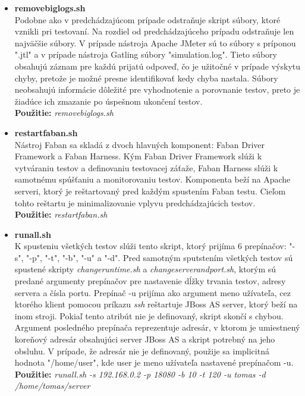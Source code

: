 \documentclass[12pt,oneside,final]{fithesis-utf8}
\newcommand\underscore[1]{\underline{\hspace{8pt}}}
\begin{document}
\begin{itemize}
\item \textbf{remove\underscore{}big\underscore{}logs.sh}\\
Podobne ako v predchádzajúcom prípade odstraňuje skript súbory, ktoré vznikli pri testovaní. Na rozdiel od predchádzajúceho prípadu odstraňuje len najväčšie súbory. V prípade nástroja Apache JMeter sú to súbory s príponou "{}.jtl"{} a v prípade nástroja Gatling súbory "{}simulation.log"{}. Tieto súbory obsahujú záznam pre každú prijatú odpoveď, čo je užitočné v prípade výskytu chyby, pretože je možné presne identifikovať kedy chyba nastala. Súbory neobsahujú informácie dôležité pre vyhodnotenie a porovnanie testov, preto je žiadúce ich zmazanie po úspešnom ukončení testov.\\
\textbf{Použitie:} \textit{remove\underscore{}big\underscore{}logs.sh}

\item \textbf{restart\underscore{}faban.sh}\\
Nástroj Faban sa skladá z dvoch hlavných komponent: Faban Driver Framework a Faban Harness. Kým Faban Driver Framework slúži k vytváraniu testov a definovaniu testovacej záťaže, Faban Harness slúži k samotnému spúšťaniu a monitorovaniu testov. Komponenta beží na Apache serveri, ktorý je reštartovaný pred každým spustením Faban testu. Cieľom tohto reštartu je minimalizovanie vplyvu predchádzajúcich testov.\\
\textbf{Použitie:} \textit{restart\underscore{}faban.sh}

\item \textbf{run\underscore{}all.sh}\\
K spusteniu všetkých testov slúži tento skript, ktorý prijíma 6 prepínačov: "{}-s"{}, "{}-p"{}, "{}-t"{}, "{}-b"{}, "{}-u"{} a "{}-d"{}. Pred samotným sputstením všetkých testov sú spustené skripty \textit{change\underscore{}runtime.sh} a \textit{change\underscore{}server\underscore{}and\underscore{}port.sh}, ktorým sú predané argumenty prepínačov pre nastavenie dĺžky trvania testov, adresy servera a čísla portu. Prepínač -u prijíma ako argument meno užívateľa, cez ktorého klient pomocou príkazu \textit{ssh} reštartuje JBoss AS server, ktorý beží na inom stroji. Pokiaľ tento atribút nie je definovaný, skript skončí s chybou. Argument posledného prepínača reprezentuje adresár, v ktorom je umiestnený koreňový adresár obsahujúci server JBoss AS a skript potrebný na jeho obsluhu. V prípade, že adresár nie je definovaný, použije sa implicitná hodnota "{/home/user}"{}, kde user je meno užívateľa nastavené prepínačom -u.\\
\textbf{Použitie:} \textit{run\underscore{}all.sh -s 192.168.0.2 -p 18080 -b 10 -t 120 -u tomas -d /home/tomas/server}

\end{itemize}
\end{document}
